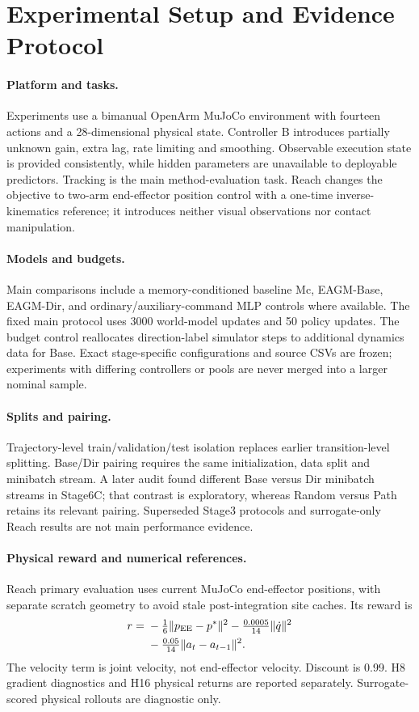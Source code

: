 \section{Experimental Setup and Evidence Protocol}
\paragraph{Platform and tasks.}
Experiments use a bimanual OpenArm MuJoCo environment with fourteen actions and a 28-dimensional physical state. Controller B introduces partially unknown gain, extra lag, rate limiting and smoothing. Observable execution state is provided consistently, while hidden parameters are unavailable to deployable predictors. Tracking is the main method-evaluation task. Reach changes the objective to two-arm end-effector position control with a one-time inverse-kinematics reference; it introduces neither visual observations nor contact manipulation.

\paragraph{Models and budgets.}
Main comparisons include a memory-conditioned baseline Mc, EAGM-Base, EAGM-Dir, and ordinary/auxiliary-command MLP controls where available. The fixed main protocol uses 3000 world-model updates and 50 policy updates. The budget control reallocates direction-label simulator steps to additional dynamics data for Base. Exact stage-specific configurations and source CSVs are frozen; experiments with differing controllers or pools are never merged into a larger nominal sample.

\paragraph{Splits and pairing.}
Trajectory-level train/validation/test isolation replaces earlier transition-level splitting. Base/Dir pairing requires the same initialization, data split and minibatch stream. A later audit found different Base versus Dir minibatch streams in Stage6C; that contrast is exploratory, whereas Random versus Path retains its relevant pairing. Superseded Stage3 protocols and surrogate-only Reach results are not main performance evidence.

\paragraph{Physical reward and numerical references.}
Reach primary evaluation uses current MuJoCo end-effector positions, with separate scratch geometry to avoid stale post-integration site caches. Its reward is
\begin{align}
 r={}&-\tfrac16\|p_{\rm EE}-p^*\|^2
       -\tfrac{0.0005}{14}\|\dot q\|^2\nonumber\\
     &-\tfrac{0.05}{14}\|a_t-a_{t-1}\|^2.
\end{align}
The velocity term is joint velocity, not end-effector velocity. Discount is 0.99. H8 gradient diagnostics and H16 physical returns are reported separately. Surrogate-scored physical rollouts are diagnostic only.

